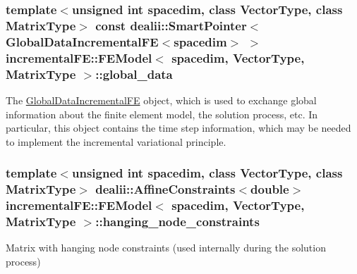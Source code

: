 \subsubsection[{\texorpdfstring{global\+\_\+data}{global_data}}]{\setlength{\rightskip}{0pt plus 5cm}template$<$unsigned int spacedim, class Vector\+Type, class Matrix\+Type$>$ const dealii\+::\+Smart\+Pointer$<${\bf Global\+Data\+Incremental\+FE}$<$spacedim$>$ $>$ {\bf incremental\+F\+E\+::\+F\+E\+Model}$<$ spacedim, {\bf Vector\+Type}, Matrix\+Type $>$\+::global\+\_\+data\hspace{0.3cm}{\ttfamily [private]}}\hypertarget{classincremental_f_e_1_1_f_e_model_aa0619a9d4856459cfcdaf6fb82995496}{}\label{classincremental_f_e_1_1_f_e_model_aa0619a9d4856459cfcdaf6fb82995496}
The \hyperlink{classincremental_f_e_1_1_global_data_incremental_f_e}{Global\+Data\+Incremental\+FE} object, which is used to exchange global information about the finite element model, the solution process, etc. In particular, this object contains the time step information, which may be needed to implement the incremental variational principle. 
\subsubsection[{\texorpdfstring{hanging\+\_\+node\+\_\+constraints}{hanging_node_constraints}}]{\setlength{\rightskip}{0pt plus 5cm}template$<$unsigned int spacedim, class Vector\+Type, class Matrix\+Type$>$ dealii\+::\+Affine\+Constraints$<$double$>$ {\bf incremental\+F\+E\+::\+F\+E\+Model}$<$ spacedim, {\bf Vector\+Type}, Matrix\+Type $>$\+::hanging\+\_\+node\+\_\+constraints\hspace{0.3cm}{\ttfamily [private]}}\hypertarget{classincremental_f_e_1_1_f_e_model_a0f155b0f56492027fcbb2f7982d42fcf}{}\label{classincremental_f_e_1_1_f_e_model_a0f155b0f56492027fcbb2f7982d42fcf}
Matrix with hanging node constraints (used internally during the solution process) 
